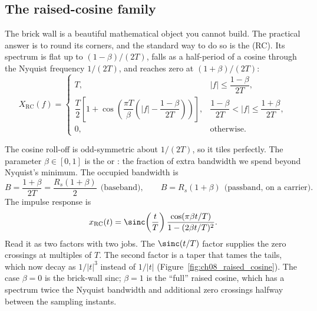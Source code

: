 \subsection{The raised-cosine family}



The brick wall is a beautiful mathematical object you cannot build. The practical answer is to
round its corners, and the standard way to do so is the  (RC). Its
spectrum is flat up to $(1-\beta)/(2T)$, falls as a half-period of a cosine through the Nyquist
frequency $1/(2T)$, and reaches zero at $(1+\beta)/(2T)$:
\begin{equation}
X_{\mathrm{RC}}(f)=\begin{cases}
T, & |f|\le\dfrac{1-\beta}{2T},\\[2mm]
\dfrac T2\left[1+\cos\!\left(\dfrac{\pi T}{\beta}\left(|f|-\dfrac{1-\beta}{2T}\right)\right)\right], & \dfrac{1-\beta}{2T}<|f|\le\dfrac{1+\beta}{2T},\\[2mm]
0, & \text{otherwise.}
\end{cases}
\label{eq:ch08:rcspec}
\end{equation}

The cosine roll-off is odd-symmetric about $1/(2T)$, so it tiles perfectly. The parameter
$\beta\in[0,1]$ is the  or : the fraction of extra
bandwidth we spend beyond Nyquist's minimum. The occupied bandwidth is
\begin{equation}
B=\frac{1+\beta}{2T}=\frac{R_s(1+\beta)}{2}\ \ \text{(baseband)},\qquad
B=R_s(1+\beta)\ \ \text{(passband, on a carrier).}
\label{eq:ch08:rcbw}
\end{equation}
The impulse response is
\begin{equation}
x_{\mathrm{RC}}(t)=\sinc\!\left(\frac tT\right)\frac{\cos(\pi\beta t/T)}{1-(2\beta t/T)^2}.
\label{eq:ch08:rctime}
\end{equation}
Read it as two factors with two jobs. The $\sinc(t/T)$ factor supplies the zero crossings at
multiples of $T$. The second factor is a taper that tames the tails, which now decay as
$1/|t|^3$ instead of $1/|t|$ (Figure~\ref{fig:ch08_raised_cosine}). The case $\beta=0$ is the
brick-wall sinc; $\beta=1$ is the ``full'' raised cosine, which has a spectrum twice the Nyquist
bandwidth and additional zero crossings halfway between the sampling instants.

